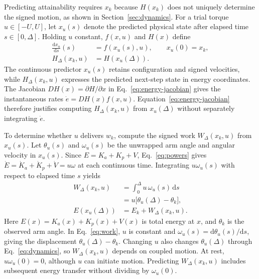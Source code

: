 \documentclass[letterpaper,10pt,conference]{ieeeconf}
\newcommand{\dd}{\mathrm{d}}
\begin{document}
Predicting attainability requires $x_k$ because $H(x_k)$ does not uniquely determine the signed motion, as shown in Section~\ref{sec:dynamics}. For a trial torque $u\in[-U,U]$, let $x_u(s)$ denote the predicted physical state after elapsed time $s\in[0,\Delta]$. Holding $u$ constant, $f(x,u)$ and $H(x)$ define
\begin{equation}
\begin{aligned}
 \frac{\dd x_u}{\dd s}(s)&=f(x_u(s),u),\qquad x_u(0)=x_k,\\
 H_\Delta(x_k,u)&=H\!\left(x_u(\Delta)\right).
\end{aligned}
\label{eq:energy-prediction}
\end{equation}
The continuous predictor $x_u(s)$ retains configuration and signed velocities, while $H_\Delta(x_k,u)$ expresses the predicted next-step state in energy coordinates. The Jacobian $DH(x)=\partial H/\partial x$ in Eq.~\eqref{eq:energy-jacobian} gives the instantaneous rates $\dot e=DH(x)f(x,u)$. Equation~\eqref{eq:energy-jacobian} therefore justifies computing $H_\Delta(x_k,u)$ from $x_u(\Delta)$ without separately integrating $\dot e$.

To determine whether $u$ delivers $w_k$, compute the signed work $W_\Delta(x_k,u)$ from $x_u(s)$. Let $\theta_u(s)$ and $\omega_u(s)$ be the unwrapped arm angle and angular velocity in $x_u(s)$. Since $E=K_a+K_p+V$, Eq.~\eqref{eq:powers} gives $\dot E=\dot K_a+\dot K_p+\dot V=u\omega$ at each continuous time. Integrating $u\omega_u(s)$ with respect to elapsed time $s$ yields
\begin{equation}
\begin{aligned}
 W_\Delta(x_k,u)&=\int_0^\Delta u\,\omega_u(s)\,\dd s\\
 &=u\bigl[\theta_u(\Delta)-\theta_k\bigr],\\
 E\!\left(x_u(\Delta)\right)&=E_k+W_\Delta(x_k,u).
\end{aligned}
\label{eq:work}
\end{equation}
Here $E(x)=K_a(x)+K_p(x)+V(x)$ is total energy at $x$, and $\theta_k$ is the observed arm angle. In Eq.~\eqref{eq:work}, $u$ is constant and $\omega_u(s)=\dd\theta_u(s)/\dd s$, giving the displacement $\theta_u(\Delta)-\theta_k$. Changing $u$ also changes $\theta_u(\Delta)$ through Eq.~\eqref{eq:dynamics}, so $W_\Delta(x_k,u)$ depends on coupled motion. At rest, $u\omega_u(0)=0$, although $u$ can initiate motion. Predicting $W_\Delta(x_k,u)$ includes subsequent energy transfer without dividing by $\omega_u(0)$.
\end{document}
